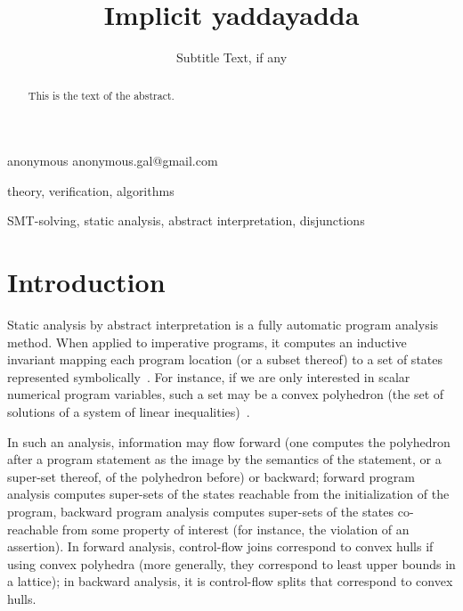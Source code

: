 \documentclass[preprint]{sigplanconf}
\begin{document}
\copyrightdata{[to be supplied]} 


\title{Implicit yaddayadda}
\subtitle{Subtitle Text, if any}

           {anonymous}
           {anonymous.gal@gmail.com}

\maketitle

\begin{abstract}
This is the text of the abstract.
\end{abstract}


\terms
theory, verification, algorithms

\keywords
SMT-solving, static analysis, abstract interpretation, disjunctions

\section{Introduction}
Static analysis by abstract interpretation is a fully automatic program analysis method. When applied to imperative programs, it computes an inductive invariant mapping each program location (or a subset thereof) to a set of states represented symbolically~\cite{CousotCousot_JLC92}.
For instance, if we are only interested in scalar numerical program variables, such a set may be a convex polyhedron (the set of solutions of a system of linear inequalities)~\cite{CousotHalbwachs78,PPL,BagnaraHZ08SCP}.

In such an analysis, information may flow forward (one computes the polyhedron after a program statement as the image by the semantics of the statement, or a super-set thereof, of the polyhedron before) or backward;
forward program analysis computes super-sets of the states reachable from the initialization of the program, backward program analysis computes super-sets of the states co-reachable from some property of interest (for instance, the violation of an assertion).
In forward analysis, control-flow joins correspond to convex hulls if using convex polyhedra (more generally, they correspond to least upper bounds in a lattice); in backward analysis, it is control-flow splits that correspond to convex hulls.
\end{document}
